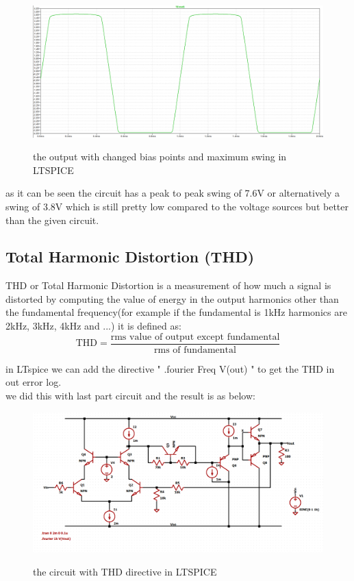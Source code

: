\documentclass[11pt]{article}
\begin{document}
\begin{figure}[H]
    \begin{center}
        \includegraphics[scale=0.45]{Fig/outputBasicTweaked.png}
        \label{fig:TweakedOutput}
        \caption{the output with changed bias points and maximum swing in LTSPICE}
    \end{center}
\end{figure}

as it can be seen the circuit has a peak to peak swing of 7.6V or alternatively
a swing of 3.8V which is still pretty low compared to the voltage sources but better than the given
circuit. \\

\subsection{Total Harmonic Distortion (THD)}
THD or Total Harmonic Distortion is a measurement of how much a signal is distorted
by computing the value of energy in the output harmonics other than the fundamental frequency(for
example if the fundamental is 1kHz harmonics are 2kHz, 3kHz, 4kHz and ...) it is defined as: \\
$$ \text{THD} = \frac{\text{rms value of output except fundamental}}{\text{rms of fundamental}} $$

in LTspice we can add the directive " .fourier {Freq} V(out) " to get the THD in
out error log. \\

we did this with last part circuit and the result is as below: \\

\begin{figure}[H]
    \begin{center}
        \includegraphics[scale=0.45]{Fig/circuitBasicTHD.png}
        \label{fig:TweakedCircuitTHD}
        \caption{the circuit with THD directive in LTSPICE}
    \end{center}
\end{figure}
\end{document}
